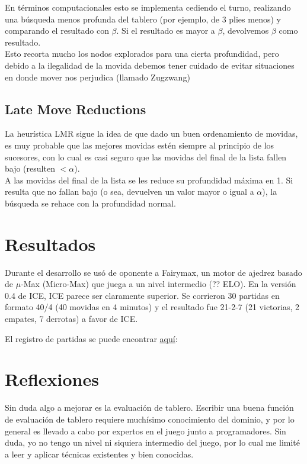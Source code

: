 \documentclass{article}
\begin{document}
En términos computacionales esto se implementa cediendo el turno, realizando
una búsqueda menos profunda del tablero (por ejemplo, de 3 plies menos) y comparando el resultado con $\beta$. Si el resultado es mayor a $\beta$, devolvemos $\beta$ como resultado.
\\

Esto recorta mucho los nodos explorados para una cierta profundidad,
pero debido a la ilegalidad de la movida debemos tener cuidado de evitar
situaciones en donde mover nos perjudica (llamado Zugzwang)
\\

\subsection{Late Move Reductions}
La heurística LMR sigue la idea de que dado un buen ordenamiento de
movidas, es muy probable que las mejores movidas estén siempre al
principio de los sucesores, con lo cual es casi seguro que las movidas
del final de la lista fallen bajo (resulten $< \alpha$).
\\

A las movidas del final de la lista se les reduce su profundidad máxima
en 1. Si resulta que no fallan bajo (o sea, devuelven un valor mayor o
igual a $\alpha$), la búsqueda se rehace con la profundidad normal.
\\

\section{Resultados}
Durante el desarrollo se usó de oponente a Fairymax, un motor de
ajedrez basado de $\mu$-Max (Micro-Max) que juega a un nivel intermedio
(?? ELO). En la versión 0.4 de ICE, ICE parece ser claramente superior.
Se corrieron 30 partidas en formato 40/4 (40 movidas en 4 minutos) y el
resultado fue 21-2-7 (21 victorias, 2 empates, 7 derrotas) a favor de
ICE.

El registro de partidas se puede encontrar
\href{http://labdcc.fceia.unr.edu.ar/~gmartinez/ice\_fairy\_40\_4.pgn}
{aquí}:

\section{Reflexiones}
Sin duda algo a mejorar es la evaluación de tablero. Escribir una buena
función de evaluación de tablero requiere muchísimo conocimiento
del dominio, y por lo general es llevado a cabo por expertos en el
juego junto a programadores. Sin duda, yo no tengo un nivel ni siquiera
intermedio del juego, por lo cual me limité a leer y aplicar técnicas
existentes y bien conocidas.
\\
\end{document}
